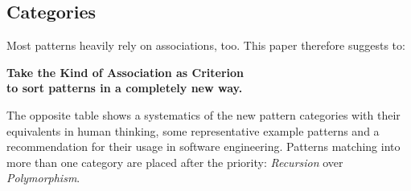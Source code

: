 %
%
%
%
%
%
%

\subsection{Categories}
\label{categories_heading}

Most patterns heavily rely on associations, too. This paper therefore suggests to:

\begin{center}
    \textbf{Take the Kind of Association as Criterion\\
    to sort patterns in a completely new way.}
\end{center}

The opposite table shows a systematics of the new pattern categories with their
equivalents in human thinking, some representative example patterns and a
recommendation for their usage in software engineering. Patterns matching into
more than one category are placed after the priority: \emph{Recursion} over
\emph{Polymorphism}.

